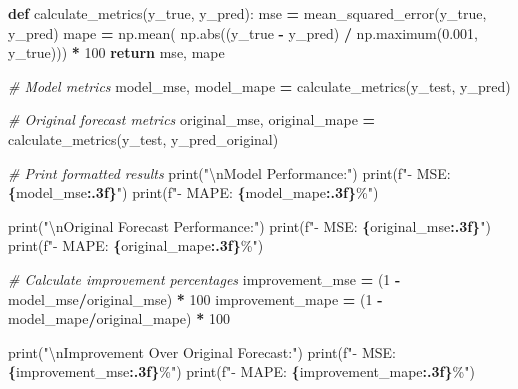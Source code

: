 \documentclass[mstat,12pt]{unswthesis}
\newenvironment{Shaded}{\begin{snugshade}}{\end{snugshade}}
\newcommand{\BuiltInTok}[1]{#1}
\newcommand{\CharTok}[1]{\textcolor[rgb]{0.31,0.60,0.02}{#1}}
\newcommand{\CommentTok}[1]{\textcolor[rgb]{0.56,0.35,0.01}{\textit{#1}}}
\newcommand{\ControlFlowTok}[1]{\textcolor[rgb]{0.13,0.29,0.53}{\textbf{#1}}}
\newcommand{\DecValTok}[1]{\textcolor[rgb]{0.00,0.00,0.81}{#1}}
\newcommand{\FloatTok}[1]{\textcolor[rgb]{0.00,0.00,0.81}{#1}}
\newcommand{\KeywordTok}[1]{\textcolor[rgb]{0.13,0.29,0.53}{\textbf{#1}}}
\newcommand{\NormalTok}[1]{#1}
\newcommand{\OperatorTok}[1]{\textcolor[rgb]{0.81,0.36,0.00}{\textbf{#1}}}
\newcommand{\SpecialCharTok}[1]{\textcolor[rgb]{0.81,0.36,0.00}{\textbf{#1}}}
\newcommand{\SpecialStringTok}[1]{\textcolor[rgb]{0.31,0.60,0.02}{#1}}
\newcommand{\StringTok}[1]{\textcolor[rgb]{0.31,0.60,0.02}{#1}}
\begin{document}
\begin{Shaded}
\begin{Highlighting}[]
\KeywordTok{def}\NormalTok{ calculate\_metrics(y\_true, y\_pred):}
\NormalTok{    mse }\OperatorTok{=}\NormalTok{ mean\_squared\_error(y\_true, y\_pred)}
\NormalTok{    mape }\OperatorTok{=}\NormalTok{ np.mean(}
\NormalTok{        np.}\BuiltInTok{abs}\NormalTok{((y\_true }\OperatorTok{{-}}\NormalTok{ y\_pred) }\OperatorTok{/}\NormalTok{ np.maximum(}\FloatTok{0.001}\NormalTok{, y\_true))) }\OperatorTok{*} \DecValTok{100}
    \ControlFlowTok{return}\NormalTok{ mse, mape}

\CommentTok{\# Model metrics}
\NormalTok{model\_mse, model\_mape }\OperatorTok{=}\NormalTok{ calculate\_metrics(y\_test, y\_pred)}

\CommentTok{\# Original forecast metrics}
\NormalTok{original\_mse, original\_mape }\OperatorTok{=}\NormalTok{ calculate\_metrics(y\_test, y\_pred\_original)}

\CommentTok{\# Print formatted results}
\BuiltInTok{print}\NormalTok{(}\StringTok{"}\CharTok{\textbackslash{}n}\StringTok{Model Performance:"}\NormalTok{)}
\BuiltInTok{print}\NormalTok{(}\SpecialStringTok{f"{-} MSE: }\SpecialCharTok{\{}\NormalTok{model\_mse}\SpecialCharTok{:.3f\}}\SpecialStringTok{"}\NormalTok{)}
\BuiltInTok{print}\NormalTok{(}\SpecialStringTok{f"{-} MAPE: }\SpecialCharTok{\{}\NormalTok{model\_mape}\SpecialCharTok{:.3f\}}\SpecialStringTok{\%"}\NormalTok{)}

\BuiltInTok{print}\NormalTok{(}\StringTok{"}\CharTok{\textbackslash{}n}\StringTok{Original Forecast Performance:"}\NormalTok{)}
\BuiltInTok{print}\NormalTok{(}\SpecialStringTok{f"{-} MSE: }\SpecialCharTok{\{}\NormalTok{original\_mse}\SpecialCharTok{:.3f\}}\SpecialStringTok{"}\NormalTok{)}
\BuiltInTok{print}\NormalTok{(}\SpecialStringTok{f"{-} MAPE: }\SpecialCharTok{\{}\NormalTok{original\_mape}\SpecialCharTok{:.3f\}}\SpecialStringTok{\%"}\NormalTok{)}

\CommentTok{\# Calculate improvement percentages}
\NormalTok{improvement\_mse }\OperatorTok{=}\NormalTok{ (}\DecValTok{1} \OperatorTok{{-}}\NormalTok{ model\_mse}\OperatorTok{/}\NormalTok{original\_mse) }\OperatorTok{*} \DecValTok{100}
\NormalTok{improvement\_mape }\OperatorTok{=}\NormalTok{ (}\DecValTok{1} \OperatorTok{{-}}\NormalTok{ model\_mape}\OperatorTok{/}\NormalTok{original\_mape) }\OperatorTok{*} \DecValTok{100}

\BuiltInTok{print}\NormalTok{(}\StringTok{"}\CharTok{\textbackslash{}n}\StringTok{Improvement Over Original Forecast:"}\NormalTok{)}
\BuiltInTok{print}\NormalTok{(}\SpecialStringTok{f"{-} MSE: }\SpecialCharTok{\{}\NormalTok{improvement\_mse}\SpecialCharTok{:.3f\}}\SpecialStringTok{\%"}\NormalTok{)}
\BuiltInTok{print}\NormalTok{(}\SpecialStringTok{f"{-} MAPE: }\SpecialCharTok{\{}\NormalTok{improvement\_mape}\SpecialCharTok{:.3f\}}\SpecialStringTok{\%"}\NormalTok{)}


\end{Highlighting}
\end{Shaded}
\end{document}
